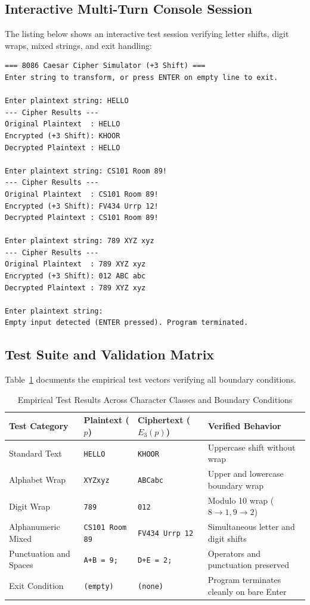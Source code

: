 \documentclass[11pt,a4paper]{article}
\begin{document}
\subsection{Interactive Multi-Turn Console Session}
The listing below shows an interactive test session verifying letter shifts, digit wraps, mixed strings, and exit handling:
\begin{lstlisting}[basicstyle=\ttfamily\footnotesize,frame=single,numbers=none]
=== 8086 Caesar Cipher Simulator (+3 Shift) ===
Enter string to transform, or press ENTER on empty line to exit.

Enter plaintext string: HELLO
--- Cipher Results ---
Original Plaintext  : HELLO
Encrypted (+3 Shift): KHOOR
Decrypted Plaintext : HELLO

Enter plaintext string: CS101 Room 89!
--- Cipher Results ---
Original Plaintext  : CS101 Room 89!
Encrypted (+3 Shift): FV434 Urrp 12!
Decrypted Plaintext : CS101 Room 89!

Enter plaintext string: 789 XYZ xyz
--- Cipher Results ---
Original Plaintext  : 789 XYZ xyz
Encrypted (+3 Shift): 012 ABC abc
Decrypted Plaintext : 789 XYZ xyz

Enter plaintext string: 
Empty input detected (ENTER pressed). Program terminated.
\end{lstlisting}

\subsection{Test Suite and Validation Matrix}
Table~\ref{tab:testsuite} documents the empirical test vectors verifying all boundary conditions.

\begin{table}[h]
\centering
\caption{Empirical Test Results Across Character Classes and Boundary Conditions}
\label{tab:testsuite}
\begin{tabularx}{\textwidth}{lll>{\raggedright\arraybackslash}X}
\toprule
\textbf{Test Category} & \textbf{Plaintext ($p$)} & \textbf{Ciphertext ($E_3(p)$)} & \textbf{Verified Behavior} \\
\midrule
Standard Text & \texttt{HELLO} & \texttt{KHOOR} & Uppercase shift without wrap \\
Alphabet Wrap & \texttt{XYZxyz} & \texttt{ABCabc} & Upper and lowercase boundary wrap \\
Digit Wrap & \texttt{789} & \texttt{012} & Modulo 10 wrap ($8 \to 1, 9 \to 2$) \\
Alphanumeric Mixed & \texttt{CS101 Room 89} & \texttt{FV434 Urrp 12} & Simultaneous letter and digit shifts \\
Punctuation and Spaces & \texttt{A+B = 9;} & \texttt{D+E = 2;} & Operators and punctuation preserved \\
Exit Condition & \texttt{(empty)} & \texttt{(none)} & Program terminates cleanly on bare Enter \\
\bottomrule
\end{tabularx}
\end{table}
\end{document}
